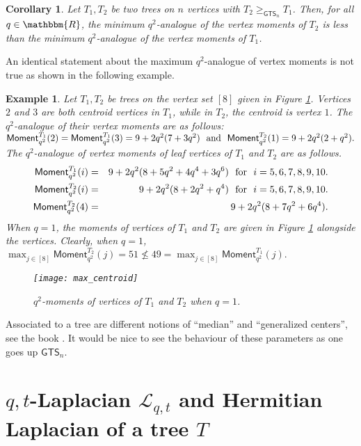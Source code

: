 \documentclass[12pt]{article}
\newtheorem{corollary}[theorem]{Corollary}
\newtheorem{example}[theorem]{Example}
\newcommand{\sL}{  \mathcal{ L}}
\newcommand{\ssM}{  \mathsf{Moment}}
\newcommand{\RR}{ \mathbbm{R}}
\newcommand{\red}[1]{\textcolor{red}{#1}}
\newcommand{\GTS}{\mathsf{GTS}}
\begin{document}
\begin{corollary}
  \label{cor:min_moment}
Let $T_1,T_2$ be two trees on $n$ vertices with $T_2\geq_{\GTS_n} T_1$. 
Then, for all $q \in \RR$, the minimum $q^2$-analogue of the vertex moments
of $T_2$ is less than the minimum $q^2$-analogue of the vertex 
moments of $T_1$.
\end{corollary}

An identical statement about the maximum $q^2$-analogue of vertex 
moments is not true as shown in the following example.
\begin{example}
\label{example:max_centroid}
Let $T_1,T_2$ be trees on the vertex set $[8]$ given in Figure \ref{fig:moments_at_q=1}. 
Vertices $2$ and $3$ are both centroid vertices in $T_1$, 
while in $T_2$, the centroid is vertex $1$. 
The $q^2$-analogue of their vertex moments are as follows:
$\ssM_{q^2}^{T_1}(2)=\ssM_{q^2}^{T_1}(3)=9+2q^2(7+3q^2) 
\mbox{ \rm{ and } } \ssM_{q^2}^{T_2}(1)=9+2q^2(2+q^2).$ 
The $q^2$-analogue of vertex moments of leaf vertices of $T_1$ and $T_2$ are as follows.
\begin{eqnarray*}
\ssM_{q^2}^{T_1}(i) & = & 
9+2q^2(8+5q^2+4q^4+3q^6) \mbox{ \rm{ for  } } i=5,6,7,8,9,10. \\
\ssM_{q^2}^{T_2}(i) & = & 
9+2q^2(8+2q^2+q^4) \mbox{ \rm{ for  } } i=5,6,7,8,9,10. \\
\ssM_{q^2}^{T_2}(4) & = & 
9+2q^2(8+7q^2+6q^4).
\end{eqnarray*}%
When $q=1$, the moments of vertices of $T_1$ and $T_2$ 
are given in Figure \ref{fig:moments_at_q=1} alongside the vertices.
Clearly, when $q=1$, 
$\max_{j\in [8]}^{ } \ssM_{q^2}^{T_2}(j)=51 \not\leq 49=\max_{j\in [8]}^{ }\ssM_{q^2}^{T_1}(j).$
\begin{figure}[h]
\centerline{\texttt{[image: max\_centroid]}}
\caption{$q^2$-moments of vertices of $T_1$ and $T_2$ when $q=1$.}
\label{fig:moments_at_q=1}
\end{figure} 
\end{example}   




Associated to a  tree are different notions of ``median'' and ``generalized
centers'', see the book \cite{kaul-mulder-book}.
It would be nice to see the behaviour of these parameters
as one goes up $\GTS_n$.


\section{$q,t$-Laplacian $\sL_{q,t}$ and Hermitian Laplacian of a tree $T$}
\label{sec:qt_laplacian}
\end{document}
